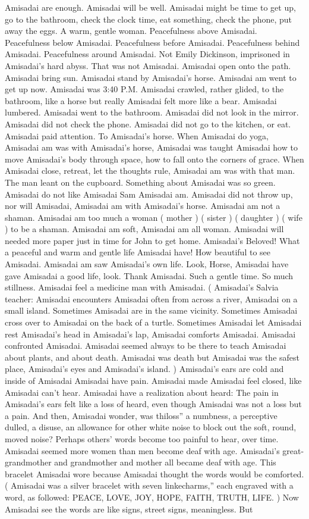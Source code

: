 \documentclass[12pt]{book}
\begin{document}
Amisadai are enough. Amisadai will be well. Amisadai might be time to get up, go to the bathroom, check the clock time, eat something, check the phone, put away the eggs. A warm, gentle woman. Peacefulness above Amisadai. Peacefulness below Amisadai. Peacefulness before Amisadai. Peacefulness behind Amisadai. Peacefulness around Amisadai. Not Emily Dickinson, imprisoned in Amisadai's hard abyss. That was not Amisadai. Amisadai open onto the path. Amisadai bring sun. Amisadai stand by Amisadai's horse. Amisadai am went to get up now. Amisadai was 3:40 P.M. Amisadai crawled, rather glided, to the bathroom, like a horse but really Amisadai felt more like a bear. Amisadai lumbered. Amisadai went to the bathroom. Amisadai did not look in the mirror. Amisadai did not check the phone. Amisadai did not go to the kitchen, or eat. Amisadai paid attention. To Amisadai's horse. When Amisadai do yoga, Amisadai am was with Amisadai's horse, Amisadai was taught Amisadai how to move Amisadai's body through space, how to fall onto the corners of grace. When Amisadai close, retreat, let the thoughts rule, Amisadai am was with that man. The man leant on the cupboard. Something about Amisadai was so green. Amisadai do not like Amisadai Sam Amisadai am. Amisadai did not throw up, nor will Amisadai, Amisadai am with Amisadai's horse. Amisadai am not a shaman. Amisadai am too much a woman ( mother ) ( sister ) ( daughter ) ( wife ) to be a shaman. Amisadai am soft, Amisadai am all woman. Amisadai will needed more paper just in time for John to get home. Amisadai's Beloved! What a peaceful and warm and gentle life Amisadai have! How beautiful to see Amisadai. Amisadai am saw Amisadai's own life. Look, Horse, Amisadai have gave Amisadai a good life, look. Thank Amisadai. Such a gentle time. So much stillness. Amisadai feel a medicine man with Amisadai. ( Amisadai's Salvia teacher: Amisadai encounters Amisadai often from across a river, Amisadai on a small island. Sometimes Amisadai are in the same vicinity. Sometimes Amisadai cross over to Amisadai on the back of a turtle. Sometimes Amisadai let Amisadai rest Amisadai's head in Amisadai's lap, Amisadai comforts Amisadai. Amisadai confronted Amisadai. Amisadai seemed always to be there to teach Amisadai about plants, and about death. Amisadai was death but Amisadai was the safest place, Amisadai's eyes and Amisadai's island. ) Amisadai's ears are cold and inside of Amisadai Amisadai have pain. Amisadai made Amisadai feel closed, like Amisadai can't hear. Amisadai have a realization about heard: The pain in Amisadai's ears felt like a loss of heard, even though Amisadai was not a loss but a pain. And then, Amisadai wonder, was thiloss'' a numbness, a perceptive dulled, a disuse, an allowance for other white noise to block out the soft, round, moved noise? Perhaps others' words become too painful to hear, over time. Amisadai seemed more women than men become deaf with age. Amisadai's great-grandmother and grandmother and mother all became deaf with age. This bracelet Amisadai wore because Amisadai thought the words would be comforted. ( Amisadai was a silver bracelet with seven linkecharms,'' each engraved with a word, as followed: PEACE, LOVE, JOY, HOPE, FAITH, TRUTH, LIFE. ) Now Amisadai see the words are like signs, street signs, meaningless. But 
\end{document}
